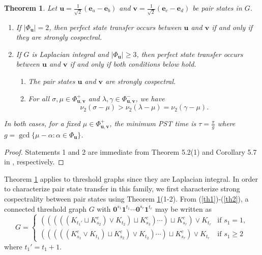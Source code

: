\documentclass[preprint]{elsarticle}
\newcommand{\supp}{{\Phi}}
\newtheorem{theorem}{Theorem}[section]
\begin{document}
\begin{theorem}
\label{pst}
Let $\mathbf{u}=\frac{1}{\sqrt2}(\mathbf{e}_a-\mathbf{e}_b)$ and $\mathbf{v}=\frac{1}{\sqrt2}(\mathbf{e}_c-\mathbf{e}_d)$ be pair states in $G$.
\begin{enumerate}
\item If $|\supp_{\mathbf{u}}|=2$, then perfect state transfer occurs between $\mathbf{u}$ and $\mathbf{v}$ if and only if they are strongly cospectral. 
\item If $G$ is Laplacian integral and $|\supp_{\mathbf{u}}|\geq 3$, then perfect state transfer occurs between $\mathbf{u}$ and $\mathbf{v}$ if and only if both conditions below hold.
\begin{enumerate}
\item The pair states $\mathbf{u}$ and $\mathbf{v}$ are strongly cospectral.
\item For all $\sigma,\mu\in\supp_{\mathbf{u},\mathbf{v}}^+$ and $\lambda,\gamma\in\supp_{\mathbf{u},\mathbf{v}}^-$, we have
\begin{equation*}
\nu_2(\sigma-\mu)>\nu_2(\lambda-\mu)=\nu_2(\gamma-\mu).
\end{equation*}
\end{enumerate}
\end{enumerate}
In both cases, for a fixed $\mu\in\supp_{\mathbf{u},\mathbf{v}}^+$, the minimum PST time is $\tau=\frac{\pi}{g}$ where $g=\operatorname{gcd}\{\mu-\alpha:\alpha\in \supp_{\mathbf{u}}\}$.
\end{theorem}

\begin{proof}
Statements 1 and 2 are immediate from Theorem 5.2(1) and Corollary 5.7 in \cite{godsil2025perfect}, respectively.
\end{proof}

Theorem \ref{pst} applies to threshold graphs since they are Laplacian integral. In order to characterize pair state transfer in this family, we first characterize strong cospectrality between pair states using Theorem \ref{pst}(1-2). From (\ref{th1})-(\ref{th2}), a connected threshold graph $G$ with $\mathbf{0}^{s_1}\mathbf{1}^{t_1}\cdots \mathbf{0}^{s_r}\mathbf{1}^{t_r}$ may be written as
\begin{equation}
\label{th3}
  G=\begin{cases}
    (((((K_{t_1'}\sqcup K^c_{s_2})\vee K_{t_2})\sqcup K^c_{s_3})\cdots)\sqcup K^c_{s_r})\vee K_{t_{r}} & \text{if $s_1=1$},\\
    (((((K^c_{s_1}\vee K_{t_1})\sqcup K^c_{s_2})\vee K_{t_2})\cdots)\sqcup K^c_{s_r})\vee K_{t_{r}} & \text{if $s_1\geq 2$}
  \end{cases}
\end{equation}
where $t_1'=t_1+1$.
\end{document}
